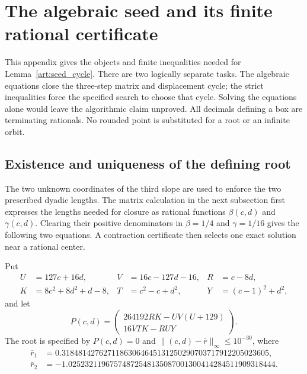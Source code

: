 \section{The algebraic seed and its finite rational certificate}
\label{art:seed_certificate}

This appendix gives the objects and finite inequalities needed for
Lemma~\ref{art:seed_cycle}. There are two logically separate tasks.
The algebraic equations close the three-step matrix and displacement cycle;
the strict inequalities force the specified search to choose that cycle.
Solving the equations alone would leave the algorithmic claim unproved.
All decimals defining a box are terminating rationals. No rounded point
is substituted for a root or an infinite orbit.

\subsection{Existence and uniqueness of the defining root}
The two unknown coordinates of the third slope are used to enforce the
two prescribed dyadic lengths. The matrix calculation in the next
subsection first expresses the lengths needed for closure as rational
functions $\beta(c,d)$ and $\gamma(c,d)$. Clearing their positive
denominators in $\beta=1/4$ and $\gamma=1/16$ gives the following
two equations. A contraction certificate then selects one exact solution
near a rational center.

Put
\begin{align*}
 U&=127c+16d,&V&=16c-127d-16,&R&=c-8d,\\
 K&=8c^2+8d^2+d-8,&T&=c^2-c+d^2,&Y&=(c-1)^2+d^2,
\end{align*}
and let
\begin{equation}\label{art:seed_polynomials}
 P(c,d)=
 \begin{pmatrix}264192RK-UV(U+129)\\16VTK-RUY\end{pmatrix}.
\end{equation}
The root is specified by $P(c,d)=0$ and
$\|(c,d)-\bar r\|_\infty\le10^{-30}$, where
\begin{align*}
 \bar r_1&=0.31848142762711863064645131250290703717912205023605,\\
 \bar r_2&=-1.02523211967574872548135087001300414284511909318444.
\end{align*}

